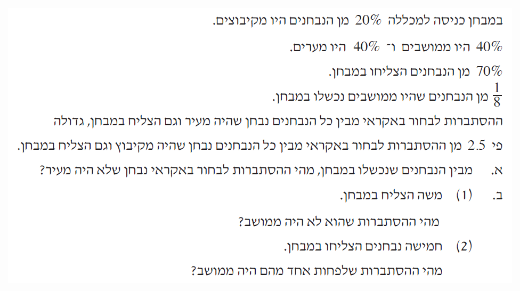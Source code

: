 \documentclass[12pt,a4paper]{article}
\begin{document}

\textbf{}

\begin{center}
\includegraphics[width=\textwidth]{summer-2016a-3}
\end{center}
\end{document}
